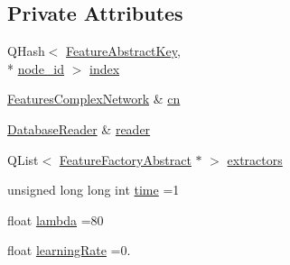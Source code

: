 \subsection*{Private Attributes}
\begin{DoxyCompactItemize}
\item 
Q\+Hash$<$ \hyperlink{class_feature_abstract_key}{Feature\+Abstract\+Key}, \\*
\hyperlink{_complex_network_8hpp_a8323334ca788fde39682469321590d52}{node\+\_\+id} $>$ \hyperlink{class_complex_network_constructor_ad616573ee07edff462c552d3fc2bfce7}{index}
\item 
\hyperlink{class_features_complex_network}{Features\+Complex\+Network} \& \hyperlink{class_complex_network_constructor_aa099456a58edc5c1885323061206b3e6}{cn}
\item 
\hyperlink{class_database_reader}{Database\+Reader} \& \hyperlink{class_complex_network_constructor_ad223ad7e464ff159d91a89deb4e943cc}{reader}
\item 
Q\+List$<$ \hyperlink{class_feature_factory_abstract}{Feature\+Factory\+Abstract} $\ast$ $>$ \hyperlink{class_complex_network_constructor_ae79b538a8b9253cd71de5fef1be1c18a}{extractors}
\item 
unsigned long long int \hyperlink{class_complex_network_constructor_afc016404ca7dda4b05807e3ca004c308}{time} =1
\item 
float \hyperlink{class_complex_network_constructor_a9d3e346719dc1f8f3093a48b8d44e669}{lambda} =80
\item 
float \hyperlink{class_complex_network_constructor_aa7fe374b9733338b8176708f77d29c55}{learning\+Rate} =0.
\end{DoxyCompactItemize}


